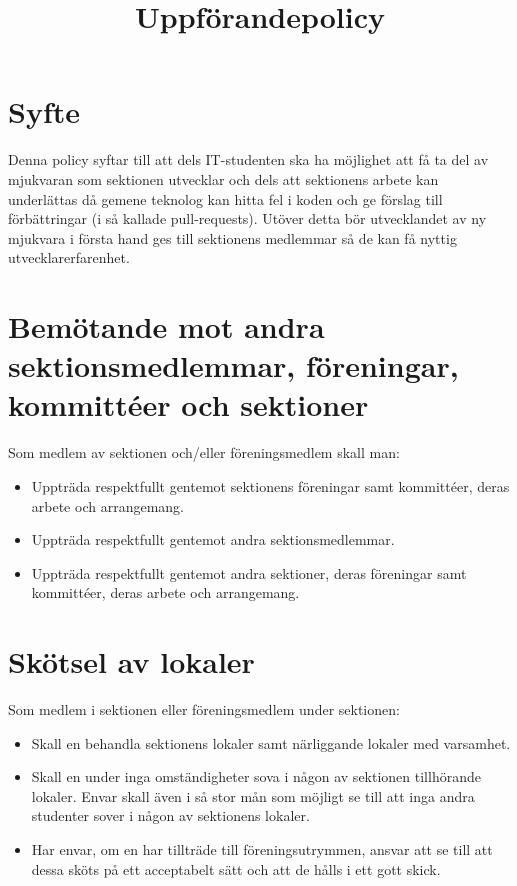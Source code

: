 \documentclass[11pt, includeaddress]{classes/cthit}
\begin{document}
\title{Uppförandepolicy}
\maketitle

\thispagestyle{empty}

\newpage

\makeheadfoot%

\setcounter{tocdepth}{2}
\setcounter{page}{1}
\tableofcontents

\newpage

\section{Syfte}
Denna policy syftar till att dels IT-studenten ska ha möjlighet att få ta del av mjukvaran som sektionen utvecklar och dels att sektionens arbete kan underlättas då gemene teknolog kan hitta fel i koden och ge förslag till förbättringar (i så kallade pull-requests). Utöver detta bör utvecklandet av ny mjukvara i första hand ges till sektionens medlemmar så de kan få nyttig utvecklarerfarenhet.

\section{Bemötande mot andra sektionsmedlemmar, föreningar, kommittéer och sektioner}
Som medlem av sektionen och/eller föreningsmedlem skall man:

\begin{itemize}
	\item Uppträda respektfullt gentemot sektionens föreningar samt kommittéer, deras arbete och arrangemang.
	\item Uppträda respektfullt gentemot andra sektionsmedlemmar.
 	\item Uppträda respektfullt gentemot andra sektioner, deras föreningar samt kommittéer, deras arbete och arrangemang.

\end{itemize}

\section{Skötsel av lokaler}
Som medlem i sektionen eller föreningsmedlem under sektionen:

\begin{itemize}
	\item Skall en behandla sektionens lokaler samt närliggande lokaler med varsamhet.
	\item Skall en under inga omständigheter sova i någon av sektionen tillhörande lokaler. Envar skall även i så stor mån som möjligt se till att inga andra studenter sover i någon av sektionens lokaler.
 	\item Har envar, om en har tillträde till föreningsutrymmen, ansvar att se till att dessa sköts på ett acceptabelt sätt och att de hålls i ett gott skick.
	
\end{itemize}
\end{document}
